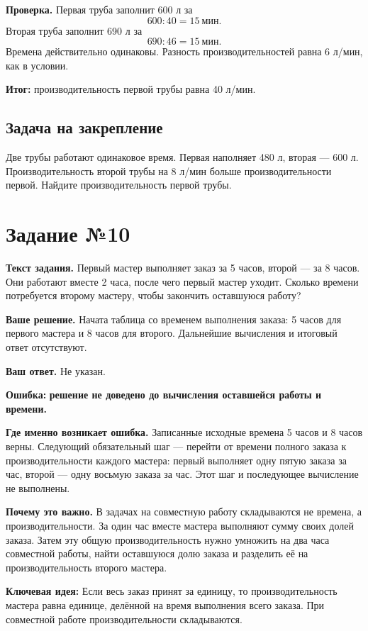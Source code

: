 \documentclass[12pt,a4paper]{article}
\newcommand{\errorlabel}[1]{\textcolor{errred}{\textbf{Ошибка:}} \textbf{#1}}
\newcommand{\keyidea}[1]{\textcolor{ideablue}{\textbf{Ключевая идея:}} #1}
\newcommand{\finalresult}[1]{\textcolor{resultteal}{\textbf{Итог:}} #1}
\begin{document}
\textbf{Проверка.} Первая труба заполнит 600 л за
\[
600:40=15\ \text{мин}.
\]
Вторая труба заполнит 690 л за
\[
690:46=15\ \text{мин}.
\]
Времена действительно одинаковы. Разность производительностей равна 6 л/мин, как в условии.

\finalresult{производительность первой трубы равна 40 л/мин.}

\subsection*{Задача на закрепление}
Две трубы работают одинаковое время. Первая наполняет 480 л, вторая --- 600 л. Производительность второй трубы на 8 л/мин больше производительности первой. Найдите производительность первой трубы.

\newpage
{}\label{task:10}
\section*{Задание №10}
\textbf{Текст задания.} Первый мастер выполняет заказ за 5 часов, второй --- за 8 часов. Они работают вместе 2 часа, после чего первый мастер уходит. Сколько времени потребуется второму мастеру, чтобы закончить оставшуюся работу?

\textbf{Ваше решение.} Начата таблица со временем выполнения заказа: 5 часов для первого мастера и 8 часов для второго. Дальнейшие вычисления и итоговый ответ отсутствуют.

\textbf{Ваш ответ.} Не указан.

\errorlabel{решение не доведено до вычисления оставшейся работы и времени.}

\textbf{Где именно возникает ошибка.} Записанные исходные времена 5 часов и 8 часов верны. Следующий обязательный шаг --- перейти от времени полного заказа к производительности каждого мастера: первый выполняет одну пятую заказа за час, второй --- одну восьмую заказа за час. Этот шаг и последующее вычисление не выполнены.

\textbf{Почему это важно.} В задачах на совместную работу складываются не времена, а производительности. За один час вместе мастера выполняют сумму своих долей заказа. Затем эту общую производительность нужно умножить на два часа совместной работы, найти оставшуюся долю заказа и разделить её на производительность второго мастера.

\keyidea{Если весь заказ принят за единицу, то производительность мастера равна единице, делённой на время выполнения всего заказа. При совместной работе производительности складываются.}
\end{document}
